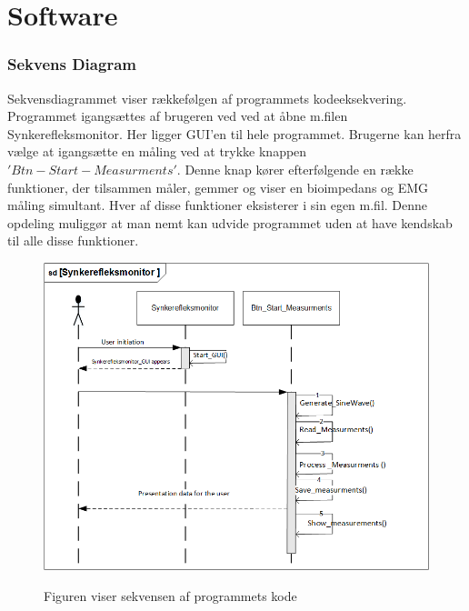 \chapter{Software}
\subsection{Sekvens Diagram}

Sekvensdiagrammet viser rækkefølgen af programmets kodeeksekvering. Programmet igangsættes af brugeren ved ved at åbne m.filen Synkerefleksmonitor. Her ligger GUI'en til hele programmet. Brugerne kan herfra vælge at igangsætte en måling ved at trykke knappen $'Btn-Start-Measurments'$. Denne knap kører efterfølgende en række funktioner, der tilsammen måler, gemmer og viser en bioimpedans og EMG måling simultant. Hver af disse funktioner eksisterer i sin egen m.fil. Denne opdeling muliggør at man nemt kan udvide programmet uden at have kendskab til alle disse funktioner.    

\begin{figure}[H]
\centering
{\includegraphics[width=\linewidth]
{Figure/SekevensDiagram}}
\caption{Figuren viser sekvensen af programmets kode}
\label{Fig:SekevensDiagram}
\end{figure} 







